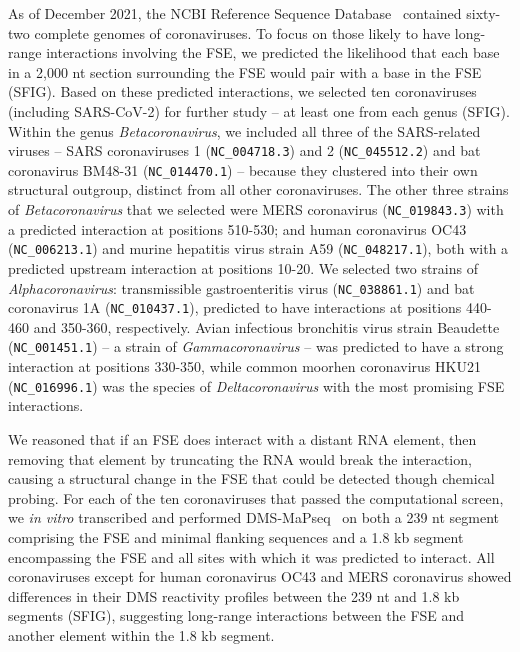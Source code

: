 \documentclass[main.tex]{subfiles}
\begin{document}
As of December 2021, the NCBI Reference Sequence Database~\cite{OLeary2016} contained sixty-two complete genomes of coronaviruses.
To focus on those likely to have long-range interactions involving the FSE, we predicted the likelihood that each base in a 2,000 nt section surrounding the FSE would pair with a base in the FSE (SFIG).
Based on these predicted interactions, we selected ten coronaviruses (including SARS-CoV-2) for further study -- at least one from each genus (SFIG).
Within the genus \textit{Betacoronavirus}, we included all three of the SARS-related viruses -- SARS coronaviruses 1 (\verb|NC_004718.3|) and 2 (\verb|NC_045512.2|) and bat coronavirus BM48-31 (\verb|NC_014470.1|) -- because they clustered into their own structural outgroup, distinct from all other coronaviruses.
The other three strains of \textit{Betacoronavirus} that we selected were MERS coronavirus (\verb|NC_019843.3|) with a predicted interaction at positions 510-530; and human coronavirus OC43 (\verb|NC_006213.1|) and murine hepatitis virus strain A59 (\verb|NC_048217.1|), both with a predicted upstream interaction at positions 10-20.
We selected two strains of \textit{Alphacoronavirus}: transmissible gastroenteritis virus (\verb|NC_038861.1|) and bat coronavirus 1A (\verb|NC_010437.1|), predicted to have interactions at positions 440-460 and 350-360, respectively.
Avian infectious bronchitis virus strain Beaudette (\verb|NC_001451.1|) -- a strain of \textit{Gammacoronavirus} -- was predicted to have a strong interaction at positions 330-350, while common moorhen coronavirus HKU21 (\verb|NC_016996.1|) was the species of \textit{Deltacoronavirus} with the most promising FSE interactions.

We reasoned that if an FSE does interact with a distant RNA element, then removing that element by truncating the RNA would break the interaction, causing a structural change in the FSE that could be detected though chemical probing.
For each of the ten coronaviruses that passed the computational screen, we \textit{in vitro} transcribed and performed DMS-MaPseq~\cite{Zubradt2016} on both a 239 nt segment comprising the FSE and minimal flanking sequences and a 1.8 kb segment encompassing the FSE and all sites with which it was predicted to interact.
All coronaviruses except for human coronavirus OC43 and MERS coronavirus showed differences in their DMS reactivity profiles between the 239 nt and 1.8 kb segments (SFIG), suggesting long-range interactions between the FSE and another element within the 1.8 kb segment.
\end{document}
